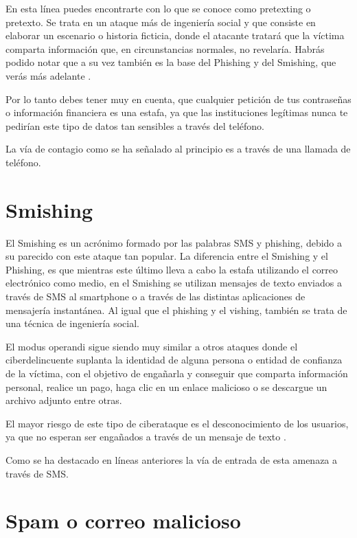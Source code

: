 \documentclass[
  spanish,
  a4paper,
  openany]{book}
\begin{document}
En esta línea puedes encontrarte con lo que se conoce como pretexting o pretexto. Se trata en un ataque más de ingeniería social y que consiste en elaborar un
escenario o historia ficticia, donde el atacante tratará que la víctima comparta información que, en circunstancias normales, no revelaría. Habrás podido notar que a su vez también es la base del Phishing y del Smishing, que verás más adelante \citep{RZ-pretexting}.

Por lo tanto debes tener muy en cuenta, que cualquier petición de tus contraseñas o información financiera es una estafa, ya que las instituciones legítimas nunca te pedirían este tipo de datos tan sensibles a través del teléfono.

La vía de contagio como se ha señalado al principio es a través de una llamada de teléfono.

\hypertarget{smishing}{%
\section{Smishing}\label{smishing}}

El Smishing es un acrónimo formado por las palabras SMS y phishing, debido a su parecido con este ataque tan popular. La diferencia entre el Smishing y el Phishing, es que mientras este último lleva a cabo la estafa utilizando el correo electrónico como medio, en el Smishing se utilizan mensajes de texto enviados a través de SMS al smartphone o a través de las distintas aplicaciones de mensajería instantánea. Al igual que el phishing y el vishing, también se trata de una técnica de ingeniería social.

El modus operandi sigue siendo muy similar a otros ataques donde el ciberdelincuente suplanta la identidad de alguna persona o entidad de confianza de la víctima, con el objetivo de engañarla y conseguir que comparta información personal, realice un pago, haga clic en un enlace malicioso o se descargue un archivo adjunto entre otras.

El mayor riesgo de este tipo de ciberataque es el desconocimiento de los usuarios, ya que no esperan ser engañados a través de un mensaje de texto \citep{INCI-smishing}.

Como se ha destacado en líneas anteriores la vía de entrada de esta amenaza a través de SMS.

\hypertarget{spam-o-correo-malicioso}{%
\section{Spam o correo malicioso}\label{spam-o-correo-malicioso}}
\end{document}
